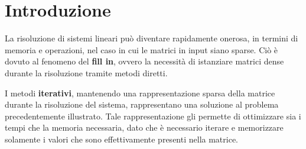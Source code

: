 \section{Introduzione}

La risoluzione di sistemi lineari può diventare rapidamente onerosa, in termini di memoria e operazioni, nel caso in cui le matrici in input siano sparse. Ciò è dovuto al fenomeno del \textbf{fill in}, ovvero la necessità di istanziare matrici dense durante la risoluzione tramite metodi diretti.

I metodi \textbf{iterativi}, mantenendo una rappresentazione sparsa della matrice durante la risoluzione del sistema, rappresentano una soluzione al problema precedentemente illustrato. Tale rappresentazione gli permette di ottimizzare sia i tempi che la memoria necessaria, dato che è necessario iterare e memorizzare solamente i valori che sono effettivamente presenti nella matrice.